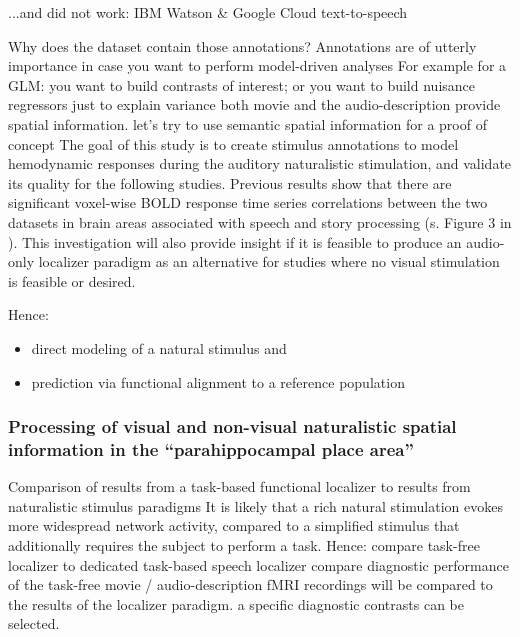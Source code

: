 ...and did not work: IBM Watson \& Google Cloud text-to-speech





%
Why does the dataset contain those annotations? Annotations are of utterly
importance in case you want to perform model-driven analyses
%
For example for a GLM: you want to build contrasts of interest; or you want to
build nuisance regressors just to explain variance
%
both movie and the audio-description provide spatial information.
%
let's try to use semantic spatial information for a proof of concept
%
The goal of this study is to create stimulus annotations to model hemodynamic
responses during the auditory naturalistic stimulation, and validate its quality
for the following studies.
%
Previous results show that there are significant voxel-wise BOLD response time
series correlations between the two datasets in brain areas associated with
speech and story processing (s. Figure 3 in \citep{hanke2016simultaneous}).
%
This investigation will also provide insight if it is feasible to produce an
audio-only localizer paradigm as an alternative for studies where no visual
stimulation is feasible or desired.

Hence:
\begin{itemize}
    \item direct modeling of a natural stimulus and
    \item prediction via functional alignment to a reference population
\end{itemize}


\subsubsection{Processing of visual and non-visual naturalistic spatial
information in the ``parahippocampal place area''}

%
Comparison of results from a task-based functional localizer to
results from naturalistic stimulus paradigms
%
It is likely that a rich natural stimulation evokes more widespread network
activity, compared to a simplified stimulus that additionally requires the
subject to perform a task.
%
Hence: compare task-free localizer to dedicated task-based speech localizer
%
compare diagnostic performance of the task-free movie / audio-description fMRI
recordings will be compared to the results of the localizer paradigm.
%
a specific diagnostic contrasts can be selected.

